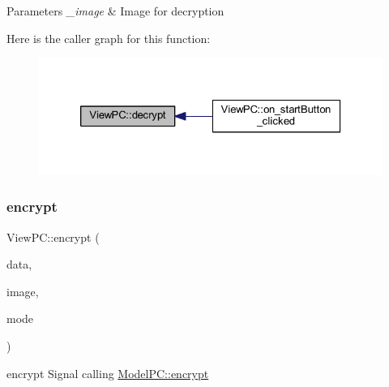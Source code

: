 \begin{DoxyParams}{Parameters}
{\em \+\_\+image} & Image for decryption \\
\hline
\end{DoxyParams}
Here is the caller graph for this function\+:
\nopagebreak
\begin{figure}[H]
\begin{center}
\leavevmode
\includegraphics[width=326pt]{class_view_p_c_acf8feb98f757cc238dada1df2308e303_icgraph}
\end{center}
\end{figure}
\mbox{\label{class_view_p_c_ade35449b95cf1c5424c4eb929f46fd73}} 
\subsubsection{\texorpdfstring{encrypt}{encrypt}}
{\footnotesize\ttfamily View\+P\+C\+::encrypt (\begin{DoxyParamCaption}\item[{Q\+Byte\+Array}]{data,  }\item[{Q\+Image $\ast$}]{image,  }\item[{int}]{mode }\end{DoxyParamCaption})\hspace{0.3cm}{\ttfamily [signal]}}



encrypt Signal calling \mbox{\hyperlink{class_model_p_c_a8ef76567bc0c0307b4e2547c46536e51}{Model\+P\+C\+::encrypt}} 


